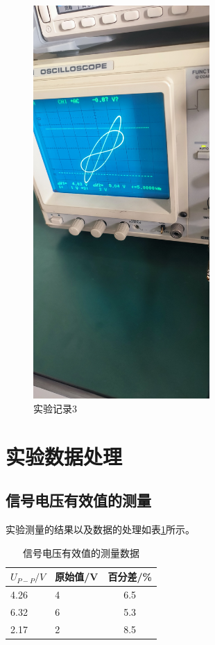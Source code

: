 \documentclass{ctexart}
\begin{document}
\begin{figure}[H]
  \centering
  \includegraphics[width=0.6\textwidth,height=0.2\textheight]{shiyanjilu3.jpg}
  \caption{实验记录3}
\end{figure}
\newpage

\section{实验数据处理}
  \subsection{信号电压有效值的测量}
  实验测量的结果以及数据的处理如表\ref{dianyaceliang}所示。
  \begin{table}[h]
    \centering   
    \caption{信号电压有效值的测量数据}\label{dianyaceliang}
    \begin{tabular}{| l || l || c |}
        \hline
        $U_{P-P}/V$ & 原始值/V & 百分差/\%\\
        \hline
        4.26 & 4 & 6.5\\
        \hline
        6.32 & 6 & 5.3\\
        \hline
        2.17 & 2 & 8.5\\
        \hline                       
    \end{tabular}
  \end{table}
\end{document}
